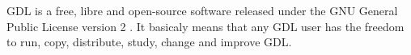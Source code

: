 GDL is a free, libre and open-source software released under the 
  GNU General Public License version 2 \citet{bib_GPL}.
It basicaly means that any GDL user has the freedom to run, copy, distribute,
  study, change and improve GDL.
